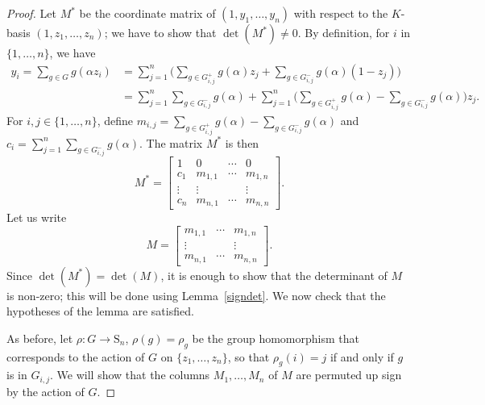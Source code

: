 \documentclass[12pt]{article}
\theoremstyle{plain}
\begin{document}
\begin{proof}
  Let $M^*$ be the coordinate matrix of $(1, y_1, \ldots,
  y_n)$ with respect to the $K$-basis $(1, z_1, \ldots, z_n)$; 
  we  have to show that $\det (M^*) \neq 0$.
  By definition, for $i$ in $\{1,\dots,n\}$, we have
  \begin{align*}
y_i = \sum_{g \in G} g ({\alpha}z_i)&= \sum_{j=1}^n \Big(\sum_{g\in G^{+}_{i,j}}g(\alpha)z_j +\sum_{g\in G^{-}_{i,j}}g(\alpha)(1-z_j)\Big)\\
&=\sum_{j=1}^n\sum_{g\in G^{-}_{i,j}}g(\alpha)+ \sum_{j=1}^n\Big(\sum_{g\in G^{+}_{i,j}}g(\alpha) -\sum_{g\in G^{-}_{i,j}}g(\alpha)\Big)z_j.
  \end{align*}
For $i,j \in \lbrace1, \ldots , n \rbrace$, define $m_{i,j} =
\sum_{g\in G^{+}_{i,j}}g(\alpha) -\sum_{g\in G^{-}_{i,j}}g(\alpha)$
and $c_i = \sum_{j=1}^n\sum_{g\in G^{-}_{i,j}}g(\alpha)$. The matrix
$M^*$ is then
$$M^* = \begin{bmatrix}
1 & 0 & \cdots & 0\\
c_1 & m_{1,1} & \cdots & m_{1,n}\\
\vdots & \vdots &  & \vdots\\
c_{n} & m_{n,1} & \cdots	& m_{n,n}
\end{bmatrix}.
$$
Let us write
$$M = \begin{bmatrix}
 m_{1,1} & \cdots & m_{1,n}\\
 \vdots &  & \vdots\\
 m_{n,1} & \cdots	& m_{n,n}
\end{bmatrix}.$$
Since $\det(M^*) = \det (M)$, it is enough to show that the
determinant of $M$ is non-zero; this will be done using
Lemma~\ref{signdet}. We now check that the hypotheses of the lemma are
satisfied.

As before, let $\rho: G \longrightarrow \mathrm{S}_n$, $\rho(g) =
\rho_g$ be the group homomorphism that corresponds to the action of
$G$ on $\lbrace z_1, \ldots , z_n \rbrace$, so that $\rho_g(i) = j$ if
and only if $g$ is in $G_{i,j}$. We will show that the columns
$M_1,\dots,M_n$ of $M$ are permuted up sign by the action of $G$.


\end{proof}
\end{document}

